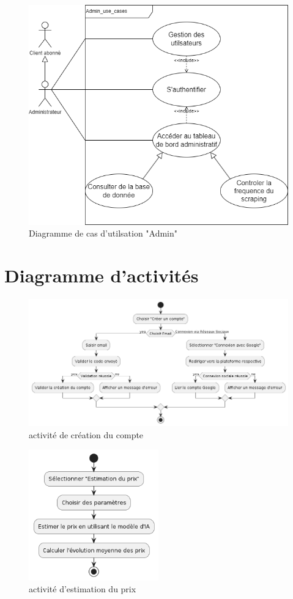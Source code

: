 \documentclass[a4paper,12pt]{report}
\numberwithin{equation}{section}
\begin{document}
\newpage
\vspace*{3.5cm}
\begin{figure}[h]
    \centering
        \includegraphics[width=\textwidth]{uml-Admin.png}
    \caption{Diagramme de cas d'utilsation "Admin"}
\end{figure}
\newpage
\section{Diagramme d'activités}
\vspace*{1cm}
\begin{figure}[h]
    \centering
        \includegraphics[width=\textwidth]{activity_account.png}
    \caption{activité de création du compte}
\end{figure}
\begin{figure}[h]
    \centering
        \includegraphics[width=0.5\textwidth]{activity_estimation.png}
    \caption{activité d’estimation du prix}
\end{figure}
\newpage
\end{document}
